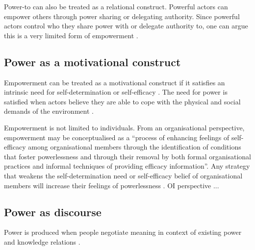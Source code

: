 Power-to can also be treated as a relational construct. Powerful actors can empower others through power sharing or delegating authority. Since powerful actors control who they share power with or delegate authority to, one can argue this is a very limited form of empowerment \citep{conger1988empowerment}. \medskip



\subsection{Power as a motivational construct}

 Empowerment can be treated as a motivational construct if it satisfies an intrinsic need for self-determination or self-efficacy \citep{deci1989self,bandura1986social}. The need for power is satisfied when actors believe they are able to cope with the physical and social demands of the environment \citep{conger1988empowerment}. \medskip

Empowerment is not limited to individuals. From an organisational perspective, empowerment may be conceptualised as a \enquote{process of enhancing feelings of self-efficacy among organisational members through the identification of conditions that foster powerlessness and through their removal by both formal organisational practices and informal techniques of providing efficacy information}. Any strategy that weakens the self-determination need or self-efficacy belief of organisational members will increase their feelings of powerlessness \citep{conger1988empowerment}. OI perspective ... \medskip

\subsection{Power as discourse}

Power is produced when people negotiate meaning in context of existing power and knowledge relations \citep{foucault1980power,rouse2005power,heizmann2015power}. 


